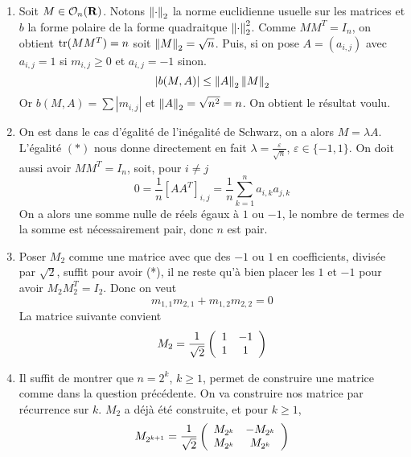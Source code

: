 \begin{correction}
	\begin{enumerate}
		\item Soit $M\in\mathcal O_n(\operatorname{\mathbf{R}})$. 
		Notons $\left\lVert \cdot\right\rVert_2$ la norme euclidienne usuelle sur les matrices et $b$ la forme polaire de la forme quadraitque $\left\lVert \cdot\right\rVert_2^2$. 
		Comme $MM^T=I_n$, on obtient $\operatorname{tr}(MM^T)=n$ soit $\left\lVert M\right\rVert_2=\sqrt n$. 
		Puis, si on pose $A=(a_{i,j})$ avec $a_{i,j}=1$ si $m_{i,j}\geq 0$ et $a_{i,j}=-1$ sinon.
		\[
			|b(M,A)|\leq\left\lVert A\right\rVert_2\left\lVert M\right\rVert_2
		\]
		Or $b(M,A)=\sum|m_{i,j}|$ et $\left\lVert A\right\rVert_2=\sqrt{n^2}=n$. 
		On obtient le résultat voulu.

		\item On est dans le cas d'égalité de l'inégalité de Schwarz, on a alors $M=\lambda A$.
		L'égalité $(*)$ nous donne directement en fait $\lambda=\frac\varepsilon{\sqrt n}$, $\varepsilon\in\lbrace -1,1\rbrace$. 
		On doit aussi avoir $MM^T=I_n$, soit, pour $i\neq j$
		\[
			0=\frac1n[AA^T]_{i,j}=\frac1n\sum_{k=1}^na_{i,k}a_{j,k}
		\]
		On a alors une somme nulle de réels égaux à $1$ ou $-1$, le nombre de termes de la somme est nécessairement pair, donc $n$ est pair.

		\item Poser $M_2$ comme une matrice avec que des $-1$ ou $1$ en coefficients, divisée par $\sqrt2$, suffit pour avoir (*),
		il ne reste qu'à bien placer les $1$ et $-1$ pour avoir $M_2M_2^T=I_2$. 
		Donc on veut
		\[
			m_{1,1}m_{2,1}+m_{1,2}m_{2,2}=0
		\]
		La matrice suivante convient 
		\[
			M_2=\frac1{\sqrt2}\left(\begin{array}{c c} 1 & -1\\ 1 & 1\end{array}\right)
		\]
		
		\item Il suffit de montrer que $n=2^k$, $k\geq 1$, permet de construire une matrice comme dans la question précédente.
		On va construire nos matrice par récurrence sur $k$. 
		$M_2$ a déjà été construite, et pour $k\geq 1$, 
		\[
			M_{2^{k+1}}=\frac1{\sqrt2}\left(\begin{array}{c c} M_{2^k} & -M_{2^k}\\ M_{2^k} & M_{2^k}\end{array}\right)
		\]
		

\end{enumerate}
\end{correction}
